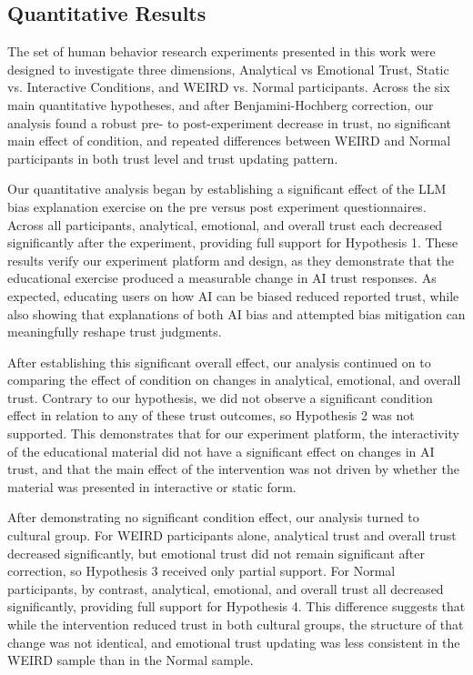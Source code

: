 \subsection{Quantitative Results}
The set of human behavior research experiments presented in this work were designed to investigate three dimensions, Analytical vs Emotional Trust, Static vs. Interactive Conditions, and WEIRD vs. Normal participants. Across the six main quantitative hypotheses, and after Benjamini-Hochberg correction, our analysis found a robust pre- to post-experiment decrease in trust, no significant main effect of condition, and repeated differences between WEIRD and Normal participants in both trust level and trust updating pattern.

Our quantitative analysis began by establishing a significant effect of the LLM bias explanation exercise on the pre versus post experiment questionnaires. Across all participants, analytical, emotional, and overall trust each decreased significantly after the experiment, providing full support for Hypothesis 1. These results verify our experiment platform and design, as they demonstrate that the educational exercise produced a measurable change in AI trust responses. As expected, educating users on how AI can be biased reduced reported trust, while also showing that explanations of both AI bias and attempted bias mitigation can meaningfully reshape trust judgments.

After establishing this significant overall effect, our analysis continued on to comparing the effect of condition on changes in analytical, emotional, and overall trust. Contrary to our hypothesis, we did not observe a significant condition effect in relation to any of these trust outcomes, so Hypothesis 2 was not supported. This demonstrates that for our experiment platform, the interactivity of the educational material did not have a significant effect on changes in AI trust, and that the main effect of the intervention was not driven by whether the material was presented in interactive or static form.

After demonstrating no significant condition effect, our analysis turned to cultural group. For WEIRD participants alone, analytical trust and overall trust decreased significantly, but emotional trust did not remain significant after correction, so Hypothesis 3 received only partial support. For Normal participants, by contrast, analytical, emotional, and overall trust all decreased significantly, providing full support for Hypothesis 4. This difference suggests that while the intervention reduced trust in both cultural groups, the structure of that change was not identical, and emotional trust updating was less consistent in the WEIRD sample than in the Normal sample.

